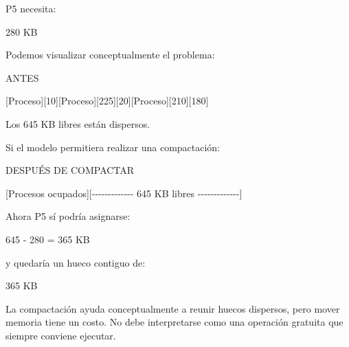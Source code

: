 \documentclass[
  spanish,
  letterpaper,
]{scrbook}
\newenvironment{Shaded}{\begin{snugshade}}{\end{snugshade}}
\newcommand{\NormalTok}[1]{\textcolor[rgb]{0.00,0.23,0.31}{#1}}
\begin{document}
P5 necesita:

\begin{Shaded}
\begin{Highlighting}[]
\NormalTok{280 KB}
\end{Highlighting}
\end{Shaded}

Podemos visualizar conceptualmente el problema:

\begin{Shaded}
\begin{Highlighting}[]
\NormalTok{ANTES}

\NormalTok{[Proceso][10][Proceso][225][20][Proceso][210][180]}

\NormalTok{Los 645 KB libres están dispersos.}
\end{Highlighting}
\end{Shaded}

Si el modelo permitiera realizar una compactación:

\begin{Shaded}
\begin{Highlighting}[]
\NormalTok{DESPUÉS DE COMPACTAR}

\NormalTok{[Procesos ocupados][{-}{-}{-}{-}{-}{-}{-}{-}{-}{-}{-}{-}{-} 645 KB libres {-}{-}{-}{-}{-}{-}{-}{-}{-}{-}{-}{-}{-}]}
\end{Highlighting}
\end{Shaded}

Ahora P5 sí podría asignarse:

\begin{Shaded}
\begin{Highlighting}[]
\NormalTok{645 {-} 280 = 365 KB}
\end{Highlighting}
\end{Shaded}

y quedaría un hueco contiguo de:

\begin{Shaded}
\begin{Highlighting}[]
\NormalTok{365 KB}
\end{Highlighting}
\end{Shaded}

\begin{tcolorbox}[enhanced jigsaw, arc=.35mm, bottomrule=.15mm, bottomtitle=1mm, breakable, colback=white, colbacktitle=quarto-callout-note-color!10!white, colframe=quarto-callout-note-color-frame, coltitle=black, left=2mm, leftrule=.75mm, opacityback=0, opacitybacktitle=0.6, rightrule=.15mm, title=\textcolor{quarto-callout-note-color}{\faInfo}\hspace{0.5em}{Recordatorio}, titlerule=0mm, toprule=.15mm, toptitle=1mm]

La compactación ayuda conceptualmente a reunir huecos dispersos, pero
mover memoria tiene un costo. No debe interpretarse como una operación
gratuita que siempre conviene ejecutar.

\end{tcolorbox}
\end{document}
